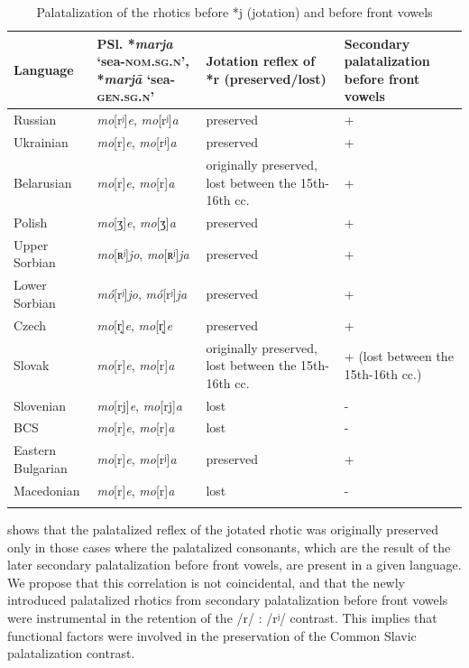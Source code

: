 \documentclass[output=paper]{langscibook}
\begin{document}
\begin{table}
\begin{tabularx}{\textwidth}{lQQQ}
\lsptoprule
Language & PSl. *\textit{marja} ‘sea-\textsc{nom.sg.n}’, *\textit{marjā} ‘sea-\textsc{gen.sg.n}’ & Jotation reflex of *r (preserved/lost) & Secondary palatalization before front vowels\\
\midrule
Russian & \textit{mo}[rʲ]\textit{e}, \textit{mo}[rʲ]\textit{a} & preserved & +\\
\tablevspace
Ukrainian & \textit{mo}[r]\textit{e}, \textit{mo}[rʲ]\textit{a} & preserved & +\\
\tablevspace
Belarusian & \textit{mo}[r]\textit{e}, \textit{mo}[r]\textit{a} & originally preserved, lost between the 15th-16th cc. & +\\
\tablevspace
Polish & \textit{mo}[ʒ]\textit{e}, \textit{mo}[ʒ]\textit{a} & preserved & +\\
\tablevspace
Upper Sorbian & \textit{mo}[ʀʲ]\textit{jo}, \textit{mo}[ʀʲ]\textit{ja} & preserved & +\\
\tablevspace
Lower Sorbian & \textit{mó}[rʲ]\textit{jo}, \textit{mó}[rʲ]\textit{ja} & preserved & +\\
\tablevspace
Czech & \textit{mo}[r̝]\textit{e}, \textit{mo}[r̝]\textit{e} & preserved & +\\
\tablevspace
Slovak & \textit{mo}[r]\textit{e}, \textit{mo}[r]\textit{a} & originally preserved, lost between the 15th{}-16th cc. & + (lost between the 15th{}-16th cc.)\\
\tablevspace
Slovenian & \textit{mo}[rj]\textit{e}, \textit{mo}[rj]\textit{a} & lost & {}-\\
\tablevspace
BCS & \textit{mo}[r]\textit{e}, \textit{mo}[r]\textit{a} & lost & {}-\\
\tablevspace
Eastern Bulgarian & \textit{mo}[r]\textit{e}, \textit{mo}[rʲ]\textit{a} & preserved & +\\
\tablevspace
Macedonian & \textit{mo}[r]\textit{e}, \textit{mo}[r]\textit{a} & lost & {}-\\
\lspbottomrule
\end{tabularx}
\caption{Palatalization of the rhotics before *j (jotation) and before front vowels}
\label{tab:kavitskaya:2}
\end{table}

 shows that the palatalized reflex of the jotated rhotic was originally preserved only in those cases where the palatalized consonants, which are the result of the later secondary palatalization before front vowels, are present in a given language. We propose that this correlation is not coincidental, and that the newly introduced palatalized rhotics from secondary palatalization before front vowels were instrumental in the retention of the /r/ : /rʲ/ contrast. This implies that functional factors were involved in the preservation of the Common Slavic palatalization contrast.
\end{document}

